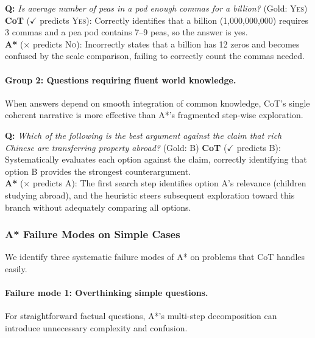 \documentclass[11pt]{article}
\begin{document}
\begin{examplebox}[title=StrategyQA --- Direct Factual Reasoning]
\textbf{Q:} \emph{Is average number of peas in a pod enough commas for a billion?} \quad (Gold: \textsc{Yes})
\tcblower
\textbf{CoT} ($\checkmark$ predicts \textsc{Yes}): Correctly identifies that a billion (1,000,000,000) requires 3 commas and a pea pod contains 7--9 peas, so the answer is yes.\\[4pt]
\textbf{A*} ($\times$ predicts \textsc{No}): Incorrectly states that a billion has 12 zeros and becomes confused by the scale comparison, failing to correctly count the commas needed.
\end{examplebox}

\paragraph{Group 2: Questions requiring fluent world knowledge.} When answers depend on smooth integration of common knowledge, CoT's single coherent narrative is more effective than A*'s fragmented step-wise exploration.

\begin{examplebox}[title=LogicQA --- Fluent Argumentation]
\textbf{Q:} \emph{Which of the following is the best argument against the claim that rich Chinese are transferring property abroad?} \quad (Gold: B)
\tcblower
\textbf{CoT} ($\checkmark$ predicts B): Systematically evaluates each option against the claim, correctly identifying that option B provides the strongest counterargument.\\[4pt]
\textbf{A*} ($\times$ predicts A): The first search step identifies option A's relevance (children studying abroad), and the heuristic steers subsequent exploration toward this branch without adequately comparing all options.
\end{examplebox}

\subsubsection{A* Failure Modes on Simple Cases}
\label{sec:astar_failures}

We identify three systematic failure modes of A* on problems that CoT handles easily.

\paragraph{Failure mode 1: Overthinking simple questions.} For straightforward factual questions, A*'s multi-step decomposition can introduce unnecessary complexity and confusion.
\end{document}
